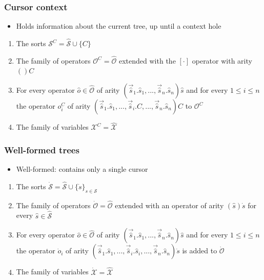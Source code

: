 \documentclass[t,24pt,aspectratio=169]{beamer}
\begin{document}
\begin{frame}
    \frametitle{Cursor context}
    \begin{itemize}
        \item Holds information about the current tree, up until a context hole
    \end{itemize}
    \vspace{1cm}
    \begin{enumerate}
        \item The sorts $\mathcal{S}^C = \hat{\mathcal{S}} \cup \{C\}$
        \item The family of operators $\mathcal{O}^C = \hat{\mathcal{O}}$ extended with the $[\cdot]$ operator with arity $()C$
        \item For every operator $\hat{o} \in \hat{\mathcal{O}}$ of arity $(\vec{\hat{s}}_1.\hat{s}_1,...,\vec{\hat{s}}_n.\hat{s}_n)\hat{s}$ and for every $1 \leq i \leq n$ the operator $o_i^C$ of arity $(\vec{\hat{s}}_1.\hat{s}_1,...,\vec{\hat{s}}_i.C,...,\vec{\hat{s}}_n.\hat{s}_n)C$ to $\mathcal{O}^C$
        \item The family of variables $\mathcal{X}^C = \hat{\mathcal{X}}$
    \end{enumerate}
\end{frame}

\begin{frame}
    \frametitle{Well-formed trees}
    \begin{itemize}
        \item Well-formed: contains only a single cursor
    \end{itemize}
    \vspace{1cm}
    \begin{enumerate}
        \item The sorts $\dot{\mathcal{S}} = \hat{\mathcal{S}} \cup \{ \dot{s} \}_{s \in \mathcal{S}}$
        \item The family of operators $\dot{\mathcal{O}} = \hat{\mathcal{O}}$ extended with an operator of arity $(\hat{s})\dot{s}$ for every $\hat{s} \in \hat{\mathcal{S}}$
        \item For every operator $\hat{o} \in \hat{\mathcal{O}}$ of arity $(\vec{\hat{s}}_1.\hat{s}_1,...,\vec{\hat{s}}_n.\hat{s}_n)\hat{s}$ and for every $1 \leq i \leq n$ the operator $\dot{o}_i$ of arity $(\vec{\hat{s}}_1.\hat{s}_1,...,\vec{\hat{s}}_i.\hat{s}_i,...,\vec{\hat{s}}_n.\hat{s}_n)\dot{s}$ is added to $\dot{\mathcal{O}}$
        \item The family of variables $\dot{\mathcal{X}} = \hat{\mathcal{X}}$
    \end{enumerate}
\end{frame}
\end{document}
